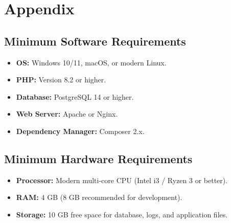 \chapter*{Appendix}

\section*{Minimum Software Requirements}
\begin{itemize}
    \item \textbf{OS:} Windows 10/11, macOS, or modern Linux.
    \item \textbf{PHP:} Version 8.2 or higher.
    \item \textbf{Database:} PostgreSQL 14 or higher.
    \item \textbf{Web Server:} Apache or Nginx.
    \item \textbf{Dependency Manager:} Composer 2.x.
\end{itemize}

\section*{Minimum Hardware Requirements}
\begin{itemize}
    \item \textbf{Processor:} Modern multi-core CPU (Intel i3 / Ryzen 3 or better).
    \item \textbf{RAM:} 4 GB (8 GB recommended for development).
    \item \textbf{Storage:} 10 GB free space for database, logs, and application files.
\end{itemize}
